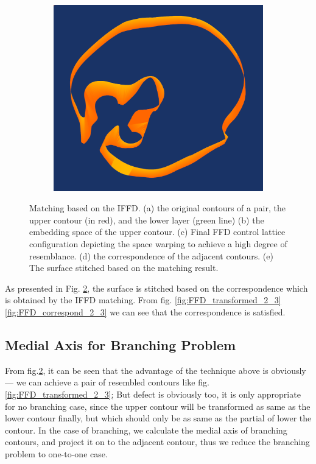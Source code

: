 \documentclass[3p,times]{elsarticle}
\begin{document}
\begin{figure}[ht]
\begin{subfigure}[b]{0.25\textwidth}
\end{subfigure}
~~~~~~~~~~~~~~~~~~~~~
\begin{subfigure}[b]{0.25\textwidth}
\includegraphics[width=\textwidth,height=0.15\textheight]{../picture/FFD_surface_2_3.png}
\caption{}
\label{fig:FFD_surface_2_3}
\end{subfigure}
\caption{Matching based on the IFFD. 
  (a) the original contours of a pair, the upper contour (in red), and the lower layer (green line)
  (b) the embedding space of the upper contour.
  (c) Final FFD control lattice configuration depicting the space
  warping to achieve a high degree of resemblance.
  (d) the correspondence of the adjacent contours.
  (e) The surface stitched based on the matching result.}
\label{fig:FFD_Result}
\end{figure}


As presented in Fig. \ref{fig:FFD_Result}, the surface is stitched
based on the correspondence which is obtained by the IFFD
matching. From fig. \ref{fig:FFD_transformed_2_3} \ref{fig:FFD_correspond_2_3} we
can see that the correspondence is satisfied.

\subsection{Medial Axis for Branching Problem}
\label{medial axis}

From fig.\ref{fig:FFD_Result}, it can be seen that the advantage of
the technique above is obviously --- we can achieve a pair of resembled contours like
fig.\ref{fig:FFD_transformed_2_3}; But defect is obviously too, it is
only appropriate for no branching case, since the upper contour will
be transformed as same as the lower contour finally, but which should
only be as same as the partial of lower the contour. In the
case of branching, we calculate the medial axis of branching
contours, and project it on to the adjacent contour, thus we reduce
the branching problem to one-to-one case.
\end{document}
